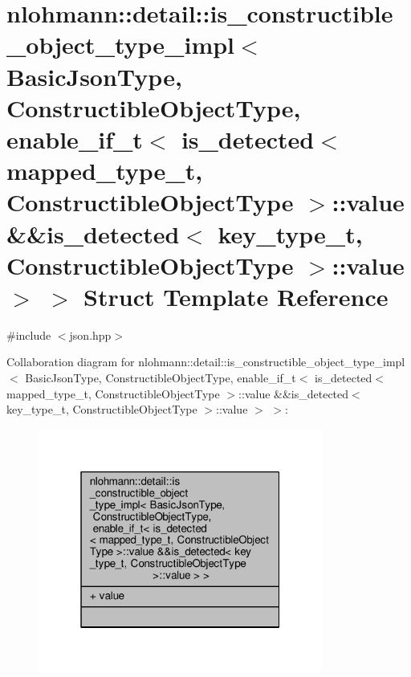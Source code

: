 \hypertarget{structnlohmann_1_1detail_1_1is__constructible__object__type__impl_3_01BasicJsonType_00_01Construa4d1e16800f2c4963485512ecf18377c}{}\section{nlohmann\+:\+:detail\+:\+:is\+\_\+constructible\+\_\+object\+\_\+type\+\_\+impl$<$ Basic\+Json\+Type, Constructible\+Object\+Type, enable\+\_\+if\+\_\+t$<$ is\+\_\+detected$<$ mapped\+\_\+type\+\_\+t, Constructible\+Object\+Type $>$\+:\+:value \&\&is\+\_\+detected$<$ key\+\_\+type\+\_\+t, Constructible\+Object\+Type $>$\+:\+:value $>$ $>$ Struct Template Reference}
\label{structnlohmann_1_1detail_1_1is__constructible__object__type__impl_3_01BasicJsonType_00_01Construa4d1e16800f2c4963485512ecf18377c}


{\ttfamily \#include $<$json.\+hpp$>$}



Collaboration diagram for nlohmann\+:\+:detail\+:\+:is\+\_\+constructible\+\_\+object\+\_\+type\+\_\+impl$<$ Basic\+Json\+Type, Constructible\+Object\+Type, enable\+\_\+if\+\_\+t$<$ is\+\_\+detected$<$ mapped\+\_\+type\+\_\+t, Constructible\+Object\+Type $>$\+:\+:value \&\&is\+\_\+detected$<$ key\+\_\+type\+\_\+t, Constructible\+Object\+Type $>$\+:\+:value $>$ $>$\+:
\nopagebreak
\begin{figure}[H]
\begin{center}
\leavevmode
\includegraphics[width=265pt]{structnlohmann_1_1detail_1_1is__constructible__object__type__impl_3_01BasicJsonType_00_01Constru1838e6fa13bf2fef45867aecca06d730}
\end{center}
\end{figure}
